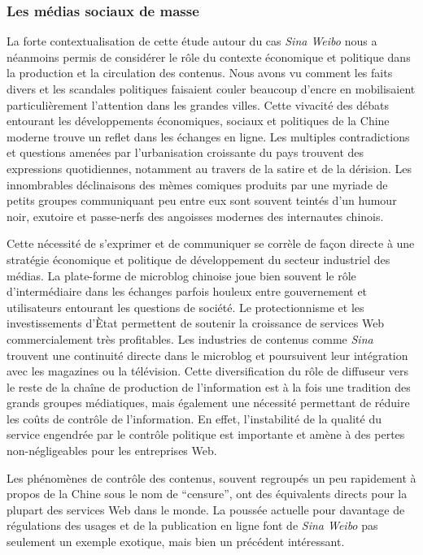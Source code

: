 \subsubsection{Les médias sociaux de masse} %

La forte contextualisation de cette étude autour du cas \textit{Sina Weibo} nous a néanmoins permis de considérer le rôle du contexte économique et politique dans la production et la circulation des contenus. Nous avons vu comment les faits divers et les scandales politiques faisaient couler beaucoup d'encre en mobilisaient particulièrement l'attention dans les grandes villes. Cette vivacité des débats entourant les développements économiques, sociaux et politiques de la Chine moderne trouve un reflet dans les échanges en ligne. Les multiples contradictions et questions amenées par l'urbanisation croissante du pays trouvent des expressions quotidiennes, notamment au travers de la satire et de la dérision. Les innombrables déclinaisons des mèmes comiques produits par une myriade de petits groupes communiquant peu entre eux sont souvent teintés d'un humour noir, exutoire et passe-nerfs des angoisses modernes des internautes chinois. 

Cette nécessité de s'exprimer et de communiquer se corrèle de façon directe à une stratégie économique et politique de développement du secteur industriel des médias. La plate-forme de microblog chinoise joue bien souvent le rôle d'intermédiaire dans les échanges parfois houleux entre gouvernement et utilisateurs entourant les questions de société. Le protectionnisme et les investissements d'Ètat permettent de soutenir la croissance de services Web commercialement très profitables. Les industries de contenus comme \textit{Sina} trouvent une continuité directe dans le microblog et poursuivent leur intégration avec les magazines ou la télévision. Cette diversification du rôle de diffuseur vers le reste de la chaîne de production de l'information est à la fois une tradition des grands groupes médiatiques, mais également une nécessité permettant de réduire les coûts de contrôle de l'information. En effet, l'instabilité de la qualité du service engendrée par le contrôle politique est importante et amène à des pertes non-négligeables pour les entreprises Web. 

Les phénomènes de contrôle des contenus, souvent regroupés un peu rapidement à propos de la Chine sous le nom de ``censure'',  ont des équivalents directs pour la plupart des services Web dans le monde. La poussée actuelle pour davantage de régulations des usages et de la publication en ligne font de \textit{Sina Weibo} pas seulement un exemple exotique, mais bien un précédent intéressant.


